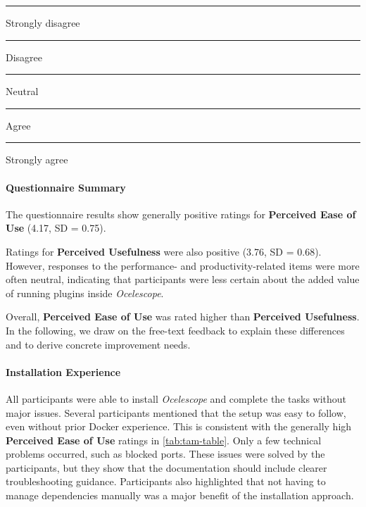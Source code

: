 \begin{table}[h]
	\vspace{0.7em}
	\scriptsize
	\textcolor{orange}{\rule{7pt}{7pt}} Strongly disagree \quad
	\textcolor{yellow}{\rule{7pt}{7pt}} Disagree \quad
	\textcolor{lightgray}{\rule{7pt}{7pt}} Neutral \quad
	\textcolor{cyan}{\rule{7pt}{7pt}} Agree \quad
	\textcolor{blue}{\rule{7pt}{7pt}} Strongly agree

	\caption{
		TAM questionnaire results for the \textit{Ocelescope} evaluation. Values are reported as mean (M) and standard deviation (SD).
	}
	\label{tab:tam-table}
\end{table}


\paragraph{Questionnaire Summary}
The questionnaire results show generally positive ratings for \textbf{Perceived Ease of Use} (4.17, SD = 0.75).

Ratings for \textbf{Perceived Usefulness} were also positive (3.76, SD = 0.68). However, responses to the performance- and productivity-related items were more often neutral, indicating that participants were less certain about the added value of running plugins inside \textit{Ocelescope}.

Overall, \textbf{Perceived Ease of Use} was rated higher than \textbf{Perceived Usefulness}. In the following, we draw on the free-text feedback to explain these differences and to derive concrete improvement needs.

\paragraph{Installation Experience}
All participants were able to install \textit{Ocelescope} and complete the tasks without major issues.
Several participants mentioned that the setup was easy to follow, even without prior Docker experience.
This is consistent with the generally high \textbf{Perceived Ease of Use} ratings in \autoref{tab:tam-table}.
Only a few technical problems occurred, such as blocked ports.
These issues were solved by the participants, but they show that the documentation should include clearer troubleshooting guidance.
Participants also highlighted that not having to manage dependencies manually was a major benefit of the installation approach.

